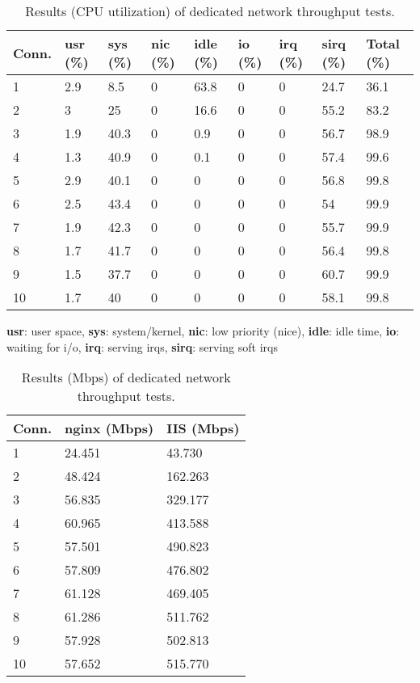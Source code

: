 \begin{table}[H]
  \centering
    \begin{tabular}{|m{1cm}|m{1.5cm}|m{1.5cm}|m{1.5cm}|m{1.5cm}|m{1.5cm}|m{1.5cm}|m{1.5cm}|m{1.5cm}|}
    \hline
    \textbf{Conn.} & \textbf{usr} (\%) & \textbf{sys} (\%) & \textbf{nic} (\%) & \textbf{idle} (\%) & \textbf{io} (\%) & \textbf{irq} (\%) & \textbf{sirq} (\%) & \textbf{Total} (\%) \\
    \hline
    1  & 2.9 & 8.5 & 0  & 63.8 & 0  & 0  & 24.7 & 36.1 \\
    2  & 3  & 25 & 0  & 16.6 & 0  & 0  & 55.2 & 83.2 \\
    3  & 1.9 & 40.3 & 0  & 0.9 & 0  & 0  & 56.7 & 98.9 \\
    4  & 1.3 & 40.9 & 0  & 0.1 & 0  & 0  & 57.4 & 99.6 \\
    5  & 2.9 & 40.1 & 0  & 0  & 0  & 0  & 56.8 & 99.8 \\
    6  & 2.5 & 43.4 & 0  & 0  & 0  & 0  & 54 & 99.9 \\
    7  & 1.9 & 42.3 & 0  & 0  & 0  & 0  & 55.7 & 99.9 \\
    8  & 1.7 & 41.7 & 0  & 0  & 0  & 0  & 56.4 & 99.8 \\
    9  & 1.5 & 37.7 & 0  & 0  & 0  & 0  & 60.7 & 99.9 \\
    10 & 1.7 & 40 & 0  & 0  & 0  & 0  & 58.1 & 99.8 \\
    \hline
    \end{tabular}
  \caption{Results (CPU utilization) of dedicated network throughput tests.}
  \label{tab:perf-io-cpu}
\end{table}

\textbf{usr}: user space, \textbf{sys}: system/kernel, \textbf{nic}: low priority (nice), \textbf{idle}: idle time, \textbf{io}: waiting for i/o, \textbf{irq}: serving irqs, \textbf{sirq}: serving soft irqs

\begin{table}[H]
  \centering
    \begin{tabular}{|m{1cm}|m{2cm}|m{2cm}|}
    \hline
    \textbf{Conn.} & \textbf{nginx} (Mbps) & \textbf{IIS} (Mbps) \\
    \hline
    1  & 24.451 & 43.730 \\
    2  & 48.424 & 162.263 \\
    3  & 56.835 & 329.177 \\
    4  & 60.965 & 413.588 \\
    5  & 57.501 & 490.823 \\
    6  & 57.809 & 476.802 \\
    7  & 61.128 & 469.405 \\
    8  & 61.286 & 511.762 \\
    9  & 57.928 & 502.813 \\
    10 & 57.652 & 515.770 \\
    \hline
    \end{tabular}
  \caption{Results (Mbps) of dedicated network throughput tests.}
  \label{tab:perf-io-mbps}
\end{table}

